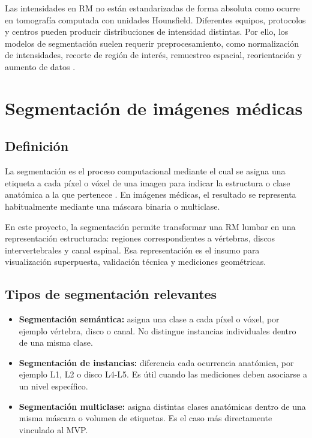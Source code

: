 Las intensidades en RM no están estandarizadas de forma absoluta como ocurre en tomografía computada con unidades Hounsfield. Diferentes equipos, protocolos y centros pueden producir distribuciones de intensidad distintas. Por ello, los modelos de segmentación suelen requerir preprocesamiento, como normalización de intensidades, recorte de región de interés, remuestreo espacial, reorientación y aumento de datos \parencite{litjens_survey_2017,isensee_nnunet_2021}.

\section{Segmentación de imágenes médicas}

\subsection{Definición}

La segmentación es el proceso computacional mediante el cual se asigna una etiqueta a cada píxel o vóxel de una imagen para indicar la estructura o clase anatómica a la que pertenece \parencite{szeliski_computer_vision_2022}. En imágenes médicas, el resultado se representa habitualmente mediante una máscara binaria o multiclase.

En este proyecto, la segmentación permite transformar una RM lumbar en una representación estructurada: regiones correspondientes a vértebras, discos intervertebrales y canal espinal. Esa representación es el insumo para visualización superpuesta, validación técnica y mediciones geométricas.

\subsection{Tipos de segmentación relevantes}

\begin{itemize}
    \item \textbf{Segmentación semántica:} asigna una clase a cada píxel o vóxel, por ejemplo vértebra, disco o canal. No distingue instancias individuales dentro de una misma clase.
    \item \textbf{Segmentación de instancias:} diferencia cada ocurrencia anatómica, por ejemplo L1, L2 o disco L4-L5. Es útil cuando las mediciones deben asociarse a un nivel específico.
    \item \textbf{Segmentación multiclase:} asigna distintas clases anatómicas dentro de una misma máscara o volumen de etiquetas. Es el caso más directamente vinculado al MVP.
\end{itemize}

